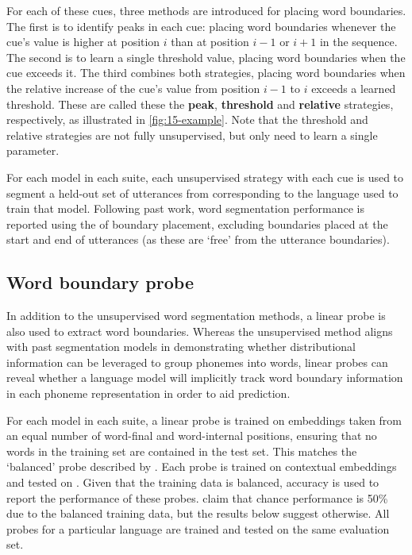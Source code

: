 For each of these cues, three methods are introduced for placing word boundaries. The first is to identify peaks in each cue: placing word boundaries whenever the cue's value is higher at position $i$ than at position $i-1$ or $i+1$ in the sequence. The second is to learn a single threshold value, placing word boundaries when the cue exceeds it. The third combines both strategies, placing word boundaries when the relative increase of the cue's value from position $i-1$ to $i$ exceeds a learned threshold. These are called these the \textbf{peak}, \textbf{threshold} and \textbf{relative} strategies, respectively, as illustrated in \cref{fig:15-example}. Note that the threshold and relative strategies are not fully unsupervised, but only need to learn a single parameter. %

For each model in each suite, each unsupervised strategy with each cue is used to segment a held-out set of utterances from \ipachildes corresponding to the language used to train that model. Following past work, word segmentation performance is reported using the \fscore of boundary placement, excluding boundaries placed at the start and end of utterances (as these are `free' from the utterance boundaries).

\subsection{Word boundary probe}

In addition to the unsupervised word segmentation methods, a linear probe is also used to extract word boundaries. Whereas the unsupervised method aligns with past segmentation models in demonstrating whether distributional information can be leveraged to group phonemes into words, linear probes can reveal whether a language model will implicitly track word boundary information in each phoneme representation in order to aid prediction. 

For each model in each suite, a linear probe is trained on embeddings taken from an equal number of word-final and word-internal positions, ensuring that no words in the training set are contained in the test set. This matches the `balanced' probe described by \citet{hahn-baroni-2019-tabula}. Each probe is trained on  contextual embeddings and tested on . Given that the training data is balanced, accuracy is used to report the performance of these probes. \citet{hahn-baroni-2019-tabula} claim that chance performance is 50\% due to the balanced training data, but the results below suggest otherwise. All probes for a particular language are trained and tested on the same evaluation set. 

